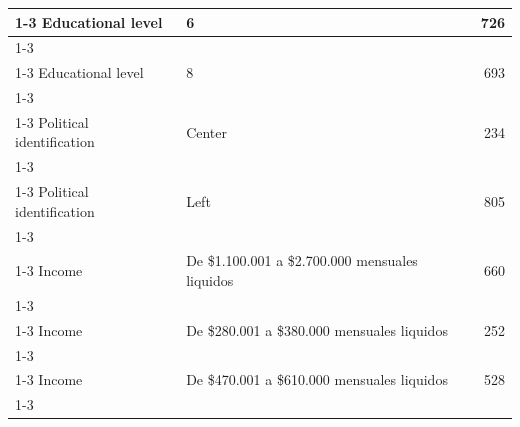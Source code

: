 \documentclass[
  spanish,
  a4paper,
  oneside]{scrbook}
\begin{document}
\begin{table}
{\begin{tabular}[t]{llr}
\cmidrule{1-3}
\hspace{1em}Educational level & 6 & 726\\
\cmidrule{1-3}
\hspace{1em}\cellcolor{gray!10}{Educational level} & \cellcolor{gray!10}{7} & \cellcolor{gray!10}{395}\\
\cmidrule{1-3}
\hspace{1em}Educational level & 8 & 693\\
\cmidrule{1-3}
\hspace{1em}\cellcolor{gray!10}{Educational level} & \cellcolor{gray!10}{9} & \cellcolor{gray!10}{177}\\
\cmidrule{1-3}
\hspace{1em}Political identification & Center & 234\\
\cmidrule{1-3}
\hspace{1em}\cellcolor{gray!10}{Political identification} & \cellcolor{gray!10}{Does not identify} & \cellcolor{gray!10}{1436}\\
\cmidrule{1-3}
\hspace{1em}Political identification & Left & 805\\
\cmidrule{1-3}
\hspace{1em}\cellcolor{gray!10}{Political identification} & \cellcolor{gray!10}{Right} & \cellcolor{gray!10}{846}\\
\cmidrule{1-3}
\hspace{1em}Income & De \$1.100.001 a \$2.700.000 mensuales liquidos & 660\\
\cmidrule{1-3}
\hspace{1em}\cellcolor{gray!10}{Income} & \cellcolor{gray!10}{De \$2.700.001 a \$4.100.000 mensuales liquidos} & \cellcolor{gray!10}{184}\\
\cmidrule{1-3}
\hspace{1em}Income & De \$280.001 a \$380.000 mensuales liquidos & 252\\
\cmidrule{1-3}
\hspace{1em}\cellcolor{gray!10}{Income} & \cellcolor{gray!10}{De \$380.001 a \$470.000 mensuales liquidos} & \cellcolor{gray!10}{324}\\
\cmidrule{1-3}
\hspace{1em}Income & De \$470.001 a \$610.000 mensuales liquidos & 528\\
\cmidrule{1-3}
\hspace{1em}\cellcolor{gray!10}{Income} & \cellcolor{gray!10}{De \$610.001 a \$730.000 mensuales liquidos} & \cellcolor{gray!10}{332}\\

\end{tabular}}
\end{table}
\end{document}

